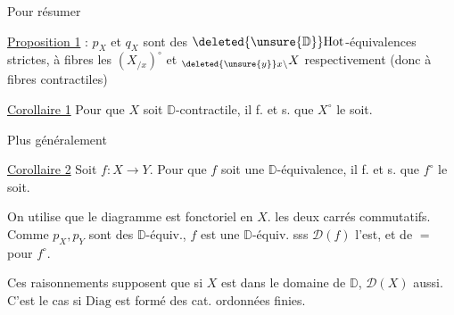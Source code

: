 
Pour résumer


\uline{Proposition 1} : $p_X$ et $q_X$ sont des $\deleted{\unsure{\mathbb D}}\mathrm{Hot}$-équivalences strictes, à fibres les $(X_{/x})^\circ$ et $ {}_{\deleted{\unsure{y}}x\backslash}X$ respectivement (donc à fibres contractiles)


 

\uline{Corollaire 1} Pour que $X$ soit $\mathbb D$-contractile, il f. et s. que $X^\circ$ le soit.

Plus généralement

\uline{Corollaire 2} Soit $f:X\longrightarrow Y$. Pour que $f$ soit une $\mathbb D$-équivalence, il f. et s. que $f^\circ$ le soit.

On utilise que le diagramme
est fonctoriel en $X$. 
les deux carrés commutatifs. Comme $p_X,p_Y$ sont des $\mathbb D$-équiv., $f$ est une $\mathbb D$-équiv. sss $\mathscr D(f)$ l'est, et de $=$ pour $f^\circ$.

Ces raisonnements supposent que si $X$ est dans le domaine de $\mathbb D$, $\mathscr D(X)$ aussi. C'est le cas si $\mathrm{Diag}$ est formé des cat. ordonnées finies.

